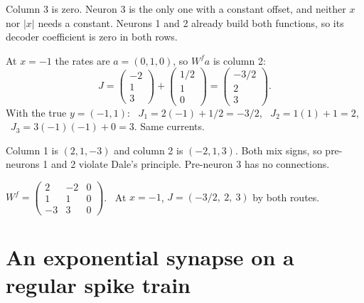 \documentclass[11pt,letterpaper]{article}
\newcommand{\ans}[1]{\par\vspace{4pt}{\bfseries #1}\quad}
\begin{document}
\ans{(c)}
Column 3 is zero. Neuron 3 is the only one with a constant offset, and neither $x$ nor $|x|$ needs a constant. Neurons 1 and 2 already build both functions, so its decoder coefficient is zero in both rows.

\ans{(d)}
At $x = -1$ the rates are $a = (0, 1, 0)$, so $W^f a$ is column 2:
\[
J = \begin{pmatrix} -2 \\ 1 \\ 3 \end{pmatrix} + \begin{pmatrix} 1/2 \\ 1 \\ 0 \end{pmatrix} = \begin{pmatrix} -3/2 \\ 2 \\ 3 \end{pmatrix}.
\]
With the true $y = (-1, 1)$: \ $J_1 = 2(-1) + 1/2 = -3/2$, \ $J_2 = 1(1) + 1 = 2$, \ $J_3 = 3(-1)(-1) + 0 = 3$. Same currents.

\ans{(e)}
Column 1 is $(2, 1, -3)$ and column 2 is $(-2, 1, 3)$. Both mix signs, so pre-neurons 1 and 2 violate Dale's principle. Pre-neuron 3 has no connections.
\begin{result}
$W^f = \begin{pmatrix} 2 & -2 & 0 \\ 1 & 1 & 0 \\ -3 & 3 & 0 \end{pmatrix}$. \ At $x = -1$, $J = (-3/2,\ 2,\ 3)$ by both routes.
\end{result}

\section{An exponential synapse on a regular spike train}
\end{document}
